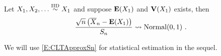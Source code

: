 {\begin{prop}
Let $X_1,X_2,\ldots \overset{{\rm IID}}{\sim} X_1$ and suppose $\mathbf{E}(X_1)$ and $\mathbf{V}(X_1)$ exists, then
\begin{equation}\label{E:CLTApproxSn}
\frac{\sqrt{n} \left( \overline{X}_n - \mathbf{E}(X_1) \right)}{S_n} \rightsquigarrow \mbox{{\rm Normal}}(0,1) \ .
\end{equation}
\end{prop}

We will use \eqref{E:CLTApproxSn} for statistical estimation in the sequel.
}%






